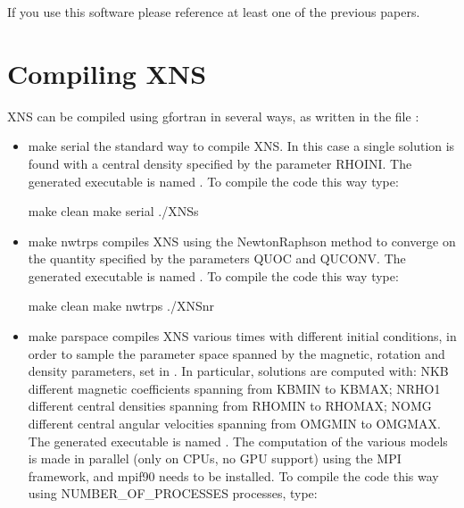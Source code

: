 \documentclass[letterpaper,10pt,english]{sphinxmanual}
\begin{document}
\sphinxAtStartPar
If you use this software please reference at least one of the previous papers.


\chapter{Compiling XNS}
\label{\detokenize{makefile:compiling-xns}}\label{\detokenize{makefile::doc}}
\sphinxAtStartPar
XNS can be compiled using gfortran in several ways, as written in the file :
\begin{itemize}
\item {} 
\sphinxAtStartPar
make serial \sphinxhyphen{} the standard way to compile XNS. In this case a single solution is found with a central density specified by the parameter RHOINI. The generated executable is named . To compile the code this way type:

\begin{sphinxVerbatim}[commandchars=\\\{\}]
    make clean make serial ./XNS\PYGZhy{}s
\end{sphinxVerbatim}

\item {} 
\sphinxAtStartPar
make nwtrps \sphinxhyphen{} compiles XNS using the Newton\sphinxhyphen{}Raphson method to converge on the quantity specified by the parameters QUOC and QUCONV. The generated executable is named . To compile the code this way type:

\begin{sphinxVerbatim}[commandchars=\\\{\}]
    make clean make nwtrps ./XNS\PYGZhy{}nr
\end{sphinxVerbatim}

\item {} 
\sphinxAtStartPar
make parspace \sphinxhyphen{} compiles XNS various times with different initial conditions, in order to sample the parameter space spanned by the magnetic, rotation and density parameters, set in . In particular, solutions are computed with: NKB different magnetic coefficients spanning from KBMIN to KBMAX; NRHO1 different central densities spanning from RHOMIN to RHOMAX; NOMG different central angular velocities spanning from OMGMIN to OMGMAX. The generated executable is named . The computation of the various models is made in parallel (only on CPUs, no GPU support) using the MPI framework, and mpif90 needs to be installed. To compile the code this way using NUMBER\_OF\_PROCESSES processes, type:


\end{itemize}
\end{document}
